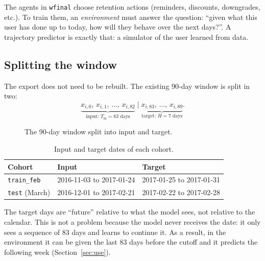 \documentclass[11pt]{article}
\newcommand{\code}[1]{\texttt{#1}}
\begin{document}
The agents in \code{wfinal} choose retention actions (reminders, discounts, downgrades, etc.). To train them, an \emph{environment} must answer the question: ``given what this user has done up to today, how will they behave over the next days?''. A trajectory predictor is exactly that: a simulator of the user learned from data.

\subsection{Splitting the window}

The export does not need to be rebuilt. The existing 90-day window is split in two:
\begin{equation}
\underbrace{x_{i,0},\, x_{i,1},\, \dots,\, x_{i,82}}_{\text{input: } T_{\text{in}} = 83 \text{ days}}
\;\Big|\;
\underbrace{x_{i,83},\, \dots,\, x_{i,89}}_{\text{target: } H = 7 \text{ days}} .
\end{equation}

\begin{figure}[H]
\centering
{}
\caption{The 90-day window split into input and target.}
\end{figure}

\begin{table}[H]
\centering
\begin{tabular}{lll}
\toprule
\textbf{Cohort} & \textbf{Input} & \textbf{Target} \\
\midrule
\code{train\_feb} & 2016-11-03 to 2017-01-24 & 2017-01-25 to 2017-01-31 \\
\code{test} (March) & 2016-12-01 to 2017-02-21 & 2017-02-22 to 2017-02-28 \\
\bottomrule
\end{tabular}
\caption{Input and target dates of each cohort.}
\end{table}

The target days are ``future'' relative to what the model sees, not relative to the calendar. This is not a problem because the model never receives the date: it only sees a sequence of 83 days and learns to continue it. As a result, in the environment it can be given the last 83 days before the cutoff and it predicts the following week (Section~\ref{sec:use}).
\end{document}
